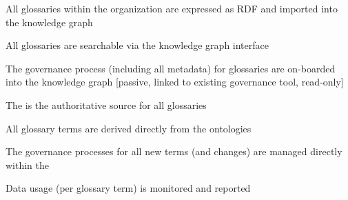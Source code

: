 \kgmmscoringlevelFour

\begin{scoring}

  \item All glossaries within the organization are expressed as RDF and imported into the knowledge graph
  \item All glossaries are searchable via the knowledge graph interface
  \item The governance process (including all metadata) for glossaries are on-boarded into the knowledge graph
        [passive, linked to existing governance tool, read-only]

\end{scoring}

\kgmmscoringlevelFive

\begin{scoring}

  \item The  is the authoritative source for all glossaries
  \item All glossary terms are derived directly from the ontologies
  \item The governance processes for all new terms (and changes) are managed directly within the 
  \item Data usage (per glossary term) is monitored and reported

\end{scoring}

